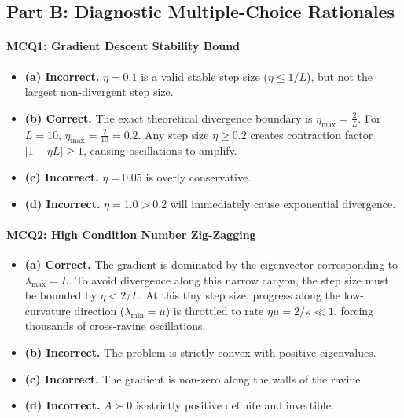\subsection*{Part B: Diagnostic Multiple-Choice Rationales}

\paragraph{MCQ1: Gradient Descent Stability Bound}
\begin{itemize}
    \item \textbf{(a) Incorrect.} $\eta = 0.1$ is a valid stable step size ($\eta \le 1/L$), but not the largest non-divergent step size.
    \item \textbf{(b) Correct.} The exact theoretical divergence boundary is $\eta_{\max} = \frac{2}{L}$. For $L = 10$, $\eta_{\max} = \frac{2}{10} = 0.2$. Any step size $\eta \ge 0.2$ creates contraction factor $|1 - \eta L| \ge 1$, causing oscillations to amplify.
    \item \textbf{(c) Incorrect.} $\eta = 0.05$ is overly conservative.
    \item \textbf{(d) Incorrect.} $\eta = 1.0 > 0.2$ will immediately cause exponential divergence.
\end{itemize}

\paragraph{MCQ2: High Condition Number Zig-Zagging}
\begin{itemize}
    \item \textbf{(a) Correct.} The gradient is dominated by the eigenvector corresponding to $\lambda_{\max} = L$. To avoid divergence along this narrow canyon, the step size must be bounded by $\eta < 2/L$. At this tiny step size, progress along the low-curvature direction ($\lambda_{\min} = \mu$) is throttled to rate $\eta \mu = 2/\kappa \ll 1$, forcing thousands of cross-ravine oscillations.
    \item \textbf{(b) Incorrect.} The problem is strictly convex with positive eigenvalues.
    \item \textbf{(c) Incorrect.} The gradient is non-zero along the walls of the ravine.
    \item \textbf{(d) Incorrect.} $A \succ 0$ is strictly positive definite and invertible.
\end{itemize}

